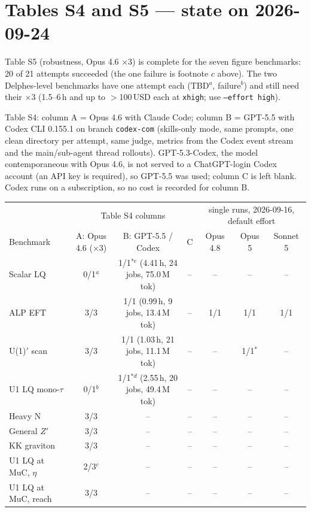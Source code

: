 \documentclass[11pt]{article}
\begin{document}
\section{Tables S4 and S5 --- state on 2026-09-24}
Table S5 (robustness, Opus 4.6 $\times$3) is complete for the seven figure benchmarks: 20 of 21 attempts succeeded (the
one failure is footnote $c$ above). The two Delphes-level benchmarks have one attempt each (TBD$^{a}$, failure$^{b}$) and
still need their $\times$3 (1.5--6\,h and up to $>$100\,USD each at \texttt{xhigh}; use \texttt{--effort high}).

Table S4: column A = Opus 4.6 with Claude Code; column B = GPT-5.5 with Codex CLI 0.155.1 on branch \texttt{codex-com}
(skills-only mode, same prompts, one clean directory per attempt, same judge, metrics from the Codex event stream and the
main/sub-agent thread rollouts). GPT-5.3-Codex, the model contemporaneous with Opus 4.6, is not served to a ChatGPT-login
Codex account (an API key is required), so GPT-5.5 was used; column C is left blank. Codex runs on a subscription, so no
cost is recorded for column B.

\begin{center}\footnotesize\setlength{\tabcolsep}{3pt}
\begin{tabular}{lccc|ccc}
\toprule
 & \multicolumn{3}{c|}{Table S4 columns} & \multicolumn{3}{c}{single runs, 2026-09-16, default effort} \\
Benchmark & A: Opus 4.6 ($\times$3) & B: GPT-5.5 / Codex & C & Opus 4.8 & Opus 5 & Sonnet 5 \\
\midrule
Scalar LQ & 0/1$^{a}$ & 1/1$^{*e}$ (4.41\,h, 24 jobs, 75.0\,M tok) & -- & -- & -- & -- \\
ALP EFT & 3/3 & 1/1 (0.99\,h, 9 jobs, 13.4\,M tok) & -- & 1/1 & 1/1 & 1/1 \\
U(1)$'$ scan & 3/3 & 1/1 (1.03\,h, 21 jobs, 11.1\,M tok) & -- & -- & 1/1$^{*}$ & -- \\
U1 LQ mono-$\tau$ & 0/1$^{b}$ & 1/1$^{*d}$ (2.55\,h, 20 jobs, 49.4\,M tok) & -- & -- & -- & -- \\
Heavy N & 3/3 & -- & -- & -- & -- & -- \\
General $Z'$ & 3/3 & -- & -- & -- & -- & -- \\
KK graviton & 3/3 & -- & -- & -- & -- & -- \\
U1 LQ at MuC, $\eta$ & 2/3$^{c}$ & -- & -- & -- & -- & -- \\
U1 LQ at MuC, reach & 3/3 & -- & -- & -- & -- & -- \\
\bottomrule
\end{tabular}
\end{center}
\end{document}
